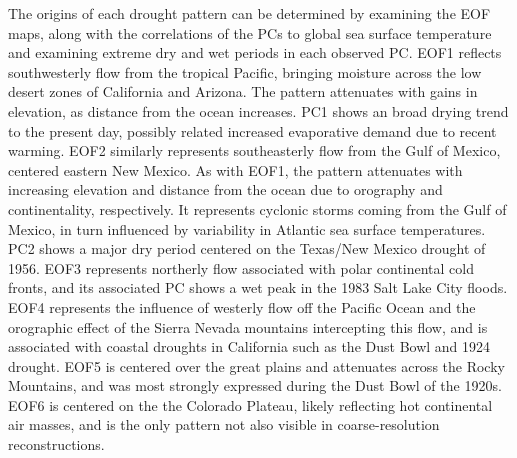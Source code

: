 \documentclass[10pt]{iopart}
\begin{document}
The origins of each drought pattern can be determined by examining the EOF maps, along with the correlations of the PCs to global sea surface temperature and examining extreme dry and wet periods in each observed PC. EOF1 reflects southwesterly flow from the tropical Pacific, bringing moisture across the low desert zones of California and Arizona. The pattern attenuates with gains in elevation, as distance from the ocean increases. PC1 shows an broad drying trend to the present day, possibly related increased evaporative demand due to recent warming. EOF2 similarly represents southeasterly flow from the Gulf of Mexico, centered eastern New Mexico. As with EOF1, the pattern attenuates with increasing elevation and distance from the ocean due to orography and continentality, respectively. It represents cyclonic storms coming from the Gulf of Mexico, in turn influenced by variability in Atlantic sea surface temperatures. PC2 shows a major dry period centered on the Texas/New Mexico drought of 1956. EOF3 represents northerly flow associated with polar continental cold fronts, and its associated PC shows a wet peak in the 1983 Salt Lake City floods. EOF4 represents the influence of westerly flow off the Pacific Ocean and the orographic effect of the Sierra Nevada mountains intercepting this flow, and is associated with coastal droughts in California such as the Dust Bowl and 1924 drought. EOF5 is centered over the great plains and attenuates across the Rocky Mountains, and was most strongly expressed during the Dust Bowl of the 1920s. EOF6 is centered on the the Colorado Plateau, likely reflecting hot continental air masses, and is the only pattern not also visible in coarse-resolution reconstructions.


\end{document}
